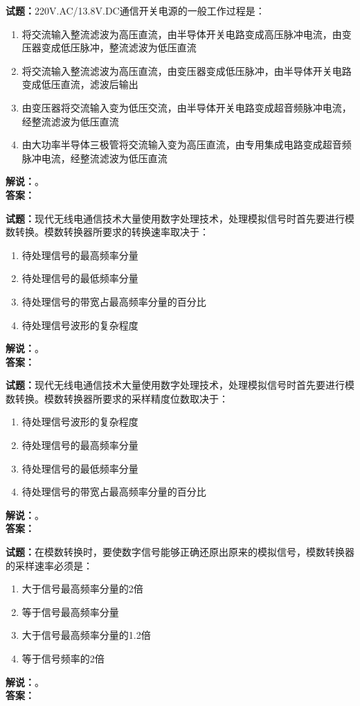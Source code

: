 \documentclass{ctexbook}
\begin{document}
\noindent\textbf{试题：}220V.AC/13.8V.DC通信开关电源的一般工作过程是：
\begin{enumerate}[leftmargin=3em]
  \item 将交流输入整流滤波为高压直流，由半导体开关电路变成高压脉冲电流，由变压器变成低压脉冲，整流滤波为低压直流
  \item 将交流输入整流滤波为高压直流，由变压器变成低压脉冲，由半导体开关电路变成低压直流，滤波后输出
  \item 由变压器将交流输入变为低压交流，由半导体开关电路变成超音频脉冲电流，经整流滤波为低压直流
  \item 由大功率半导体三极管将交流输入变为高压直流，由专用集成电路变成超音频脉冲电流，经整流滤波为低压直流
\end{enumerate}
\noindent\textbf{解说：}\textbf{}。\\\noindent\textbf{答案：}

\bigskip

\noindent\textbf{试题：}现代无线电通信技术大量使用数字处理技术，处理模拟信号时首先要进行模数转换。模数转换器所要求的转换速率取决于：
\begin{enumerate}[leftmargin=3em]
  \item 待处理信号的最高频率分量
  \item 待处理信号的最低频率分量
  \item 待处理信号的带宽占最高频率分量的百分比
  \item 待处理信号波形的复杂程度
\end{enumerate}
\noindent\textbf{解说：}\textbf{}。\\\noindent\textbf{答案：}

\bigskip

\noindent\textbf{试题：}现代无线电通信技术大量使用数字处理技术，处理模拟信号时首先要进行模数转换。模数转换器所要求的采样精度位数取决于：
\begin{enumerate}[leftmargin=3em]
  \item 待处理信号波形的复杂程度
  \item 待处理信号的最高频率分量
  \item 待处理信号的最低频率分量
  \item 待处理信号的带宽占最高频率分量的百分比
\end{enumerate}
\noindent\textbf{解说：}\textbf{}。\\\noindent\textbf{答案：}

\bigskip

\noindent\textbf{试题：}在模数转换时，要使数字信号能够正确还原出原来的模拟信号，模数转换器的采样速率必须是：
\begin{enumerate}[leftmargin=3em]
  \item 大于信号最高频率分量的2倍
  \item 等于信号最高频率分量
  \item 大于信号最高频率分量的1.2倍
  \item 等于信号频率的2倍
\end{enumerate}
\noindent\textbf{解说：}\textbf{}。\\\noindent\textbf{答案：}
\end{document}
